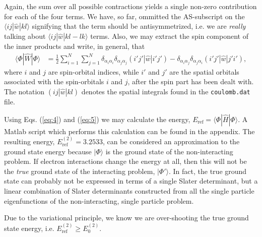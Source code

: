 \documentclass[a4paper]{article}
\begin{document}
 Again, the sum over all possible contractions yields a single non-zero contribution for each of the four terms. We have, so far, ommitted the AS-subscript on the $\langle i j | \hat{w} | k l\rangle$ signifying that the term should be antisymmetrized, i.e. we are \emph{really} talking about $\langle i j | \hat{w} | k l - l k\rangle$ terms. Also, we may extract the spin component of the inner products and write, in general, that 
 \begin{align}
 \langle \Phi | \hat{W} | \Phi \rangle &= \frac{1}{2}\sum_{i=1}^N \sum_{j=1}^N \delta_{\alpha_i\alpha_i}\delta_{\alpha_j\alpha_j}(i'j'|\hat{w}|i'j') - \delta_{\alpha_i\alpha_j}\delta_{\alpha_j\alpha_i}(i'j'|\hat{w}|j'i'), \label{eq:5}
 \end{align}
 where $i$ and $j$ are spin-orbital indices, while $i'$ and $j'$ are the spatial orbitals associated with the spin-orbitals $i$ and $j$, after the spin part has been dealt with. The notation $(ij|\hat{w}|kl)$ denotes the spatial integrals found in the \texttt{coulomb.dat} file. 

 Using Eqs. (\ref{eq:4}) and (\ref{eq:5}) we may calculate the energy, $E_\text{ref}=\langle \Phi| \hat{H} |\Phi\rangle$. A {\sc Matlab} script which performs this calculation can be found in the appendix. The resulting energy, $E_\text{ref}^{(2)}=3.2533$, can be considered an approximation to the ground state energy because $|\Phi\rangle$ is the ground state of the non-interacting problem. If electron interactions change the energy at all, then this will not be the \emph{true} ground state of the interacting problem, $|\Phi'\rangle$. In fact, the true ground state can probably not be expressed in terms of a single Slater determinant, but a linear combination of Slater determinants constructed from all the single particle eigenfunctions of the non-interacting, single particle problem.

 Due to the variational principle, we know we are over-shooting the true ground state energy, i.e. $E_\text{ref}^{(2)}\ge E_0^{(2)}$.
\end{document}
